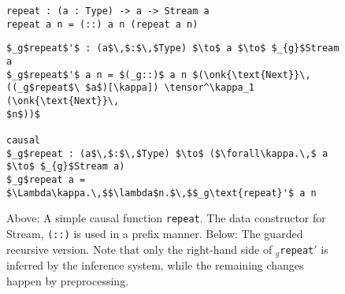 
\begin{figure}[h]
\begin{lstlisting}[mathescape, title=\ttBlock]
repeat : (a : Type) -> a -> Stream a
repeat a n = (::) a n (repeat a n)
\end{lstlisting}
\begin{lstlisting}[mathescape, title=\ttBlock]
$_g$repeat$'$ : (a$\,$:$\,$Type) $\to$ a $\to$ $_{g}$Stream a
$_g$repeat$'$ a n = $(_g::)$ a n $(\onk{\text{Next}}\,((_g$repeat$\ $a$)[\kappa]) \tensor^\kappa_1 (\onk{\text{Next}}\,
$n$))$

causal 
$_g$repeat : (a$\,$:$\,$Type) $\to$ ($\forall\kappa.\,$ a $\to$ $_{g}$Stream a)
$_g$repeat a = $\Lambda\kappa.\,$$\lambda$n.$\,$$_g\text{repeat}'$ a n
\end{lstlisting}
  \caption{Above: A simple causal function \texttt{repeat}. The data constructor for
    Stream, \texttt{(::)} is used in a prefix manner. Below: The guarded
    recursive version. Note that only the right-hand side of
    \texttt{$_g$repeat$'$} is inferred by the inference system, while the
    remaining changes happen by preprocessing.}
\label{fig:repeat_proof_example_program}
\end{figure}





